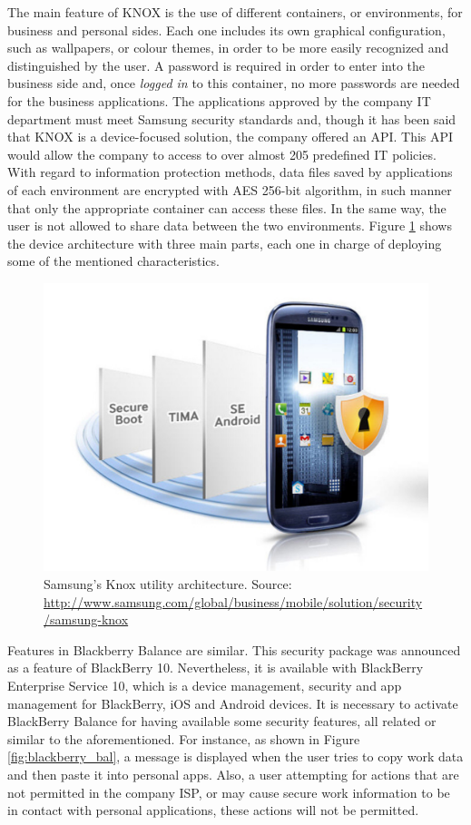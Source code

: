 The main feature of KNOX is the use of different containers, or environments, for business and personal sides. Each one includes its own graphical configuration, such as wallpapers, or colour themes, in order to be more easily recognized and distinguished by the user.
A password is required in order to enter into the business side and, once \textit{logged in} to this container, no more passwords are needed for the business applications. The applications approved by the company IT department must meet Samsung security standards and, though it has been said that KNOX is a device-focused solution, the company offered an API. This API would allow the company to access to over almost 205 predefined IT policies. With regard to information protection methods, data files saved by applications of each environment are encrypted with AES 256-bit algorithm, in such manner that only the appropriate container can access these files. In the same way, the user is not allowed to share data between the two environments. Figure \ref{fig:img_knox_01} shows the device architecture with three main parts, each one in charge of deploying some of the mentioned characteristics.

\begin{figure}
	\centering
	\includegraphics[scale =0.4] {gfx/byodSotA/samsung_knox.pdf}
	\caption{Samsung's Knox utility architecture. Source: \url{http://www.samsung.com/global/business/mobile/solution/security/samsung-knox}}
	\label{fig:img_knox_01}
\end{figure}

Features in Blackberry Balance are similar. This security package was announced as a feature of BlackBerry 10. Nevertheless, it is available with BlackBerry Enterprise Service 10, which is a device management, security and app management for BlackBerry, iOS and Android devices. It is necessary to activate BlackBerry Balance for having available some security features, all related or similar to the aforementioned. For instance, as shown in Figure \ref{fig:blackberry_bal}, a message is displayed when the user tries to copy work data and then paste it into personal apps. Also, a user attempting for actions that are not permitted in the company ISP, or may cause secure work information to be in contact with personal applications, these actions will not be permitted. 

